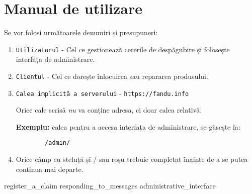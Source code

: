 \chapter{Manual de utilizare}

	Se vor folosi următoarele denumiri și presupuneri:

	\begin{enumerate}
		\item \verb|Utilizatorul| - Cel ce gestionează cererile de despăgubire și folosește interfața de administrare.
		\item \verb|Clientul| - Cel ce dorește înlocuirea sau repararea produsului.
		\item \verb|Calea implicită a serverului| - \verb|https://fandu.info|

			Orice cale scrisă \textit{nu} va conține adresa, ci doar calea relativă.

			\textbf{Exemplu:} calea pentru a accesa interfața de administrare, se găsește la:
\begin{Verbatim}
		/admin/
\end{Verbatim}
		\item Orice câmp cu steluță și / sau roșu trebuie completat înainte de a se putea continua mai departe.

	\end{enumerate}


	{register_a_claim}
	{responding_to_messages}
	{administrative_interface}


